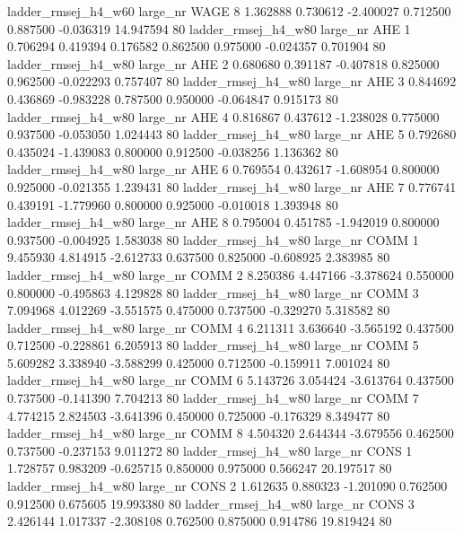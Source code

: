 ladder_rmsej_h4_w60   large_nr     WAGE                 8  1.362888  0.730612  -2.400027 0.712500 0.887500 -0.036319   14.947594 80
ladder_rmsej_h4_w80   large_nr      AHE                 1  0.706294  0.419394   0.176582 0.862500 0.975000 -0.024357    0.701904 80
ladder_rmsej_h4_w80   large_nr      AHE                 2  0.680680  0.391187  -0.407818 0.825000 0.962500 -0.022293    0.757407 80
ladder_rmsej_h4_w80   large_nr      AHE                 3  0.844692  0.436869  -0.983228 0.787500 0.950000 -0.064847    0.915173 80
ladder_rmsej_h4_w80   large_nr      AHE                 4  0.816867  0.437612  -1.238028 0.775000 0.937500 -0.053050    1.024443 80
ladder_rmsej_h4_w80   large_nr      AHE                 5  0.792680  0.435024  -1.439083 0.800000 0.912500 -0.038256    1.136362 80
ladder_rmsej_h4_w80   large_nr      AHE                 6  0.769554  0.432617  -1.608954 0.800000 0.925000 -0.021355    1.239431 80
ladder_rmsej_h4_w80   large_nr      AHE                 7  0.776741  0.439191  -1.779960 0.800000 0.925000 -0.010018    1.393948 80
ladder_rmsej_h4_w80   large_nr      AHE                 8  0.795004  0.451785  -1.942019 0.800000 0.937500 -0.004925    1.583038 80
ladder_rmsej_h4_w80   large_nr     COMM                 1  9.455930  4.814915  -2.612733 0.637500 0.825000 -0.608925    2.383985 80
ladder_rmsej_h4_w80   large_nr     COMM                 2  8.250386  4.447166  -3.378624 0.550000 0.800000 -0.495863    4.129828 80
ladder_rmsej_h4_w80   large_nr     COMM                 3  7.094968  4.012269  -3.551575 0.475000 0.737500 -0.329270    5.318582 80
ladder_rmsej_h4_w80   large_nr     COMM                 4  6.211311  3.636640  -3.565192 0.437500 0.712500 -0.228861    6.205913 80
ladder_rmsej_h4_w80   large_nr     COMM                 5  5.609282  3.338940  -3.588299 0.425000 0.712500 -0.159911    7.001024 80
ladder_rmsej_h4_w80   large_nr     COMM                 6  5.143726  3.054424  -3.613764 0.437500 0.737500 -0.141390    7.704213 80
ladder_rmsej_h4_w80   large_nr     COMM                 7  4.774215  2.824503  -3.641396 0.450000 0.725000 -0.176329    8.349477 80
ladder_rmsej_h4_w80   large_nr     COMM                 8  4.504320  2.644344  -3.679556 0.462500 0.737500 -0.237153    9.011272 80
ladder_rmsej_h4_w80   large_nr     CONS                 1  1.728757  0.983209  -0.625715 0.850000 0.975000  0.566247   20.197517 80
ladder_rmsej_h4_w80   large_nr     CONS                 2  1.612635  0.880323  -1.201090 0.762500 0.912500  0.675605   19.993380 80
ladder_rmsej_h4_w80   large_nr     CONS                 3  2.426144  1.017337  -2.308108 0.762500 0.875000  0.914786   19.819424 80
